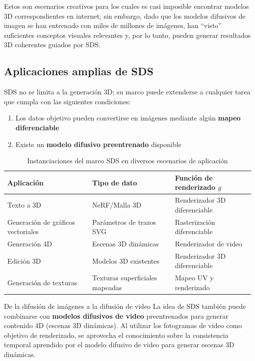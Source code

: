 Estos son escenarios creativos para los cuales es casi imposible encontrar modelos 3D correspondientes en internet; sin embargo, dado que los modelos difusivos de imagen se han entrenado con miles de millones de imágenes, han ``visto'' suficientes conceptos visuales relevantes y, por lo tanto, pueden generar resultados 3D coherentes guiados por SDS.

\subsection{Aplicaciones amplias de SDS}

SDS no se limita a la generación 3D; su marco puede extenderse a cualquier tarea que cumpla con las siguientes condiciones:
\begin{enumerate}
    \item Los datos objetivo pueden convertirse en imágenes mediante algún \textbf{mapeo diferenciable}
    \item Existe un \textbf{modelo difusivo preentrenado} disponible
\end{enumerate}

\begin{table}[H]
\centering
\begin{tabular}{lll}
\toprule
\textbf{Aplicación} & \textbf{Tipo de dato} & \textbf{Función de renderizado $g$} \\
\midrule
Texto a 3D & NeRF/Malla 3D & Renderizador 3D diferenciable \\
Generación de gráficos vectoriales & Parámetros de trazos SVG & Rasterización diferenciable \\
Generación 4D & Escenas 3D dinámicas & Renderizador de video \\
Edición 3D & Modelos 3D existentes & Renderizador 3D diferenciable \\
Generación de texturas & Texturas superficiales mapeadas & Mapeo UV y renderizado \\
\bottomrule
\end{tabular}
\caption{Instanciaciones del marco SDS en diversos escenarios de aplicación}
\end{table}

\begin{knowledgebox}{De la difusión de imágenes a la difusión de video}
La idea de SDS también puede combinarse con \textbf{modelos difusivos de video} preentrenados para generar contenido 4D (escenas 3D dinámicas). Al utilizar los fotogramas de video como objetivo de renderizado, se aprovecha el conocimiento sobre la consistencia temporal aprendido por el modelo difusivo de video para generar escenas 3D dinámicas.
\end{knowledgebox}

